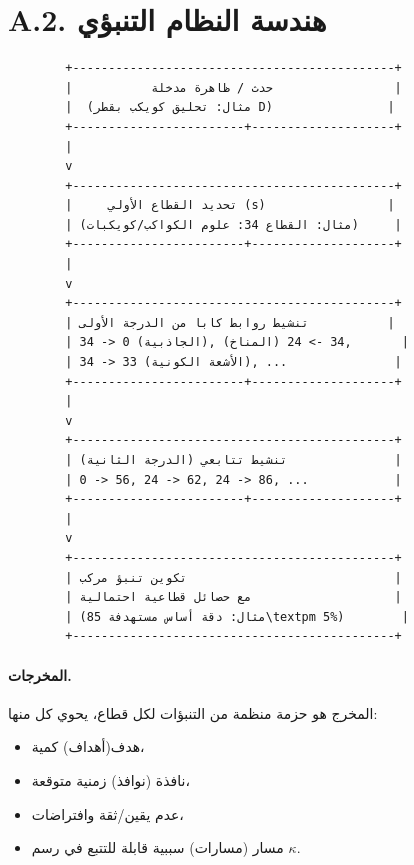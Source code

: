\documentclass[13pt,a4paper]{article}
\begin{document}
	\section*{A.2. هندسة النظام التنبؤي}
	
	\begin{lstlisting}
		+---------------------------------------------+
		|           حدث / ظاهرة مدخلة                 |
		|  (مثال: تحليق كويكب بقطر D)                |
		+------------------------+--------------------+
		|
		v
		+---------------------------------------------+
		|     تحديد القطاع الأولي (s)                 |
		| (مثال: القطاع 34: علوم الكواكب/كويكبات)     |
		+------------------------+--------------------+
		|
		v
		+---------------------------------------------+
		| تنشيط روابط كابا من الدرجة الأولى           |
		| 34 -> 0 (الجاذبية), 34 -> 24 (المناخ),       |
		| 34 -> 33 (الأشعة الكونية), ...               |
		+------------------------+--------------------+
		|
		v
		+---------------------------------------------+
		| تنشيط تتابعي (الدرجة الثانية)               |
		| 0 -> 56, 24 -> 62, 24 -> 86, ...            |
		+------------------------+--------------------+
		|
		v
		+---------------------------------------------+
		| تكوين تنبؤ مركب                             |
		| مع حصائل قطاعية احتمالية                    |
		| (مثال: دقة أساس مستهدفة 85\textpm 5%)        |
		+---------------------------------------------+
	\end{lstlisting}
	
	\paragraph{المخرجات.}
	المخرج هو حزمة منظمة من التنبؤات لكل قطاع، يحوي كل منها:
	\begin{itemize}[leftmargin=*]
		\item هدف(أهداف) كمية،
		\item نافذة (نوافذ) زمنية متوقعة،
		\item عدم يقين/ثقة وافتراضات،
		\item مسار (مسارات) سببية قابلة للتتبع في رسم $\kappa$.
	\end{itemize}
	
\end{document}
